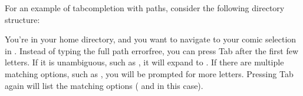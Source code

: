 \sphinxAtStartPar
For an example of tab\sphinxhyphen{}completion with paths, consider the following directory structure:

\begin{sphinxVerbatim}[commandchars=\\\{\}]
\end{sphinxVerbatim}

\sphinxAtStartPar
You’re in your home directory, and you want to navigate to your 
comic selection in .
Instead of typing the full path error\sphinxhyphen{}free, you can press Tab after the first few letters.
If it is unambiguous, such as , it will expand to .
If there are multiple matching options, such as , you will be prompted for more letters.
Pressing Tab again will list the matching options ( and  in this case).

\sphinxAtStartPar
{}

\sphinxstepscope


